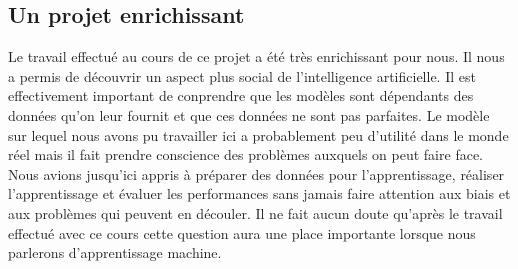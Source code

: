 \documentclass{article}
\begin{document}
    \subsection{Un projet enrichissant}
    Le travail effectué au cours de ce projet a été très enrichissant pour nous. Il nous a permis de 
    découvrir un aspect plus social de l'intelligence artificielle. Il est effectivement important de 
    conprendre que les modèles sont dépendants des données qu'on leur fournit et que ces données ne 
    sont pas parfaites. Le modèle sur lequel nous avons pu travailler ici a probablement peu d'utilité 
    dans le monde réel mais il fait prendre conscience des problèmes auxquels on peut faire face.
    Nous avions jusqu'ici appris à préparer des données pour l'apprentissage, réaliser l'apprentissage et
    évaluer les performances sans jamais faire attention aux biais et aux problèmes qui peuvent en découler.
    Il ne fait aucun doute qu'après le travail effectué avec ce cours cette question aura une place 
    importante lorsque nous parlerons d'apprentissage machine.


    \newpage
    \appendix
\end{document}
